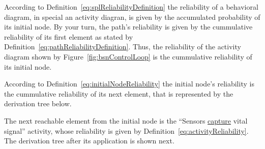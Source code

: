 
According to Definition~\ref{eq:splReliabilityDefinition} the reliability of a
behavioral diagram, in special an activity diagran, is given by the accumulated
probability of its initial node. 
By your turn, the path's reliability is given by the cummulative reliability of
its first element as stated by Definition~\ref{eq:pathReliabilityDefinition}. 
Thus, the reliability of the activity diagram shown by
Figure~\ref{fig:bsnControlLoop} is the cummulative reliability of its initial
node. 


\begin{center}
\end{center}


According to Definition~\ref{eq:initialNodeReliability} the initial node's
reliability is the cummulative reliability of its next element, that is
represented by the derivation tree below. 


\begin{center}
\end{center}


The next reachable element from the initial node is the ``Sensors
\underline{capture} vital
signal'' activity, whose reliability is given by
Definition~\ref{eq:activityReliability}. The derivation tree after its
application is shown next. 


